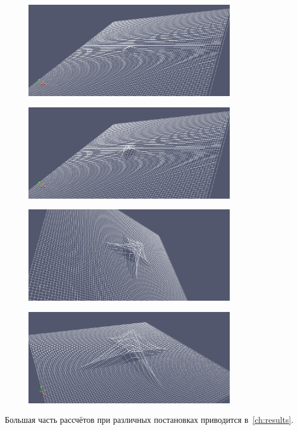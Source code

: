 \begin{figure}[H]
    \centering
    \caption{}
    \label{pic:fiber-example-2}
    \includegraphics[width=0.8\textwidth]{img/fiber/example_2.png}
\end{figure}

\begin{figure}[H]
    \centering
    \caption{}
    \label{pic:fiber-example-3}
    \includegraphics[width=0.8\textwidth]{img/fiber/example_3.png}
\end{figure}

\begin{figure}[H]
    \centering
    \caption{}
    \label{pic:fiber-example-4}
    \includegraphics[width=0.8\textwidth]{img/fiber/example_4.png}
\end{figure}

\begin{figure}[H]
    \centering
    \caption{}
    \label{pic:fiber-example-5}
    \includegraphics[width=0.8\textwidth]{img/fiber/example_5.png}
\end{figure}

Большая часть рассчётов при различных постановках приводится в~\ref{ch:results}.